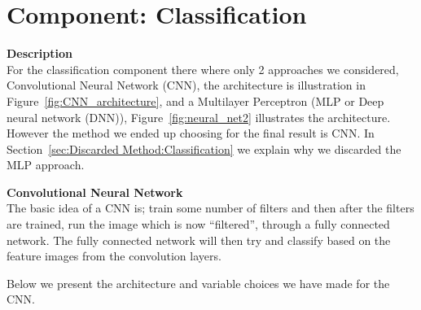 \documentclass[Report.tex]{subfiles}
\begin{document}
\section{Component: Classification}
\label{Method:Classification}
\begin{flushleft}
  \textbf{Description} \\
  For the classification component there where only 2 approaches we considered,
  Convolutional Neural Network (CNN), the architecture is illustration in
  Figure~\ref{fig:CNN_architecture}, and a Multilayer Perceptron (MLP or Deep
  neural network (DNN)), Figure~\ref{fig:neural_net2} illustrates the architecture. However the method we ended up choosing for the final result is CNN. In
  Section~\ref{sec:Discarded Method:Classification} we explain why we discarded
  the MLP approach. \par
\end{flushleft}

\begin{flushleft}
  \textbf{Convolutional Neural Network} \\
  The basic idea of a CNN is; train some number of filters and then
  after the filters are trained, run the image which is now ``filtered'', through
  a fully connected network. The fully connected network will then try and
  classify based on the feature images from the convolution layers. \par
  Below we present the architecture and variable choices we have made for the CNN.
\end{flushleft}
\end{document}

